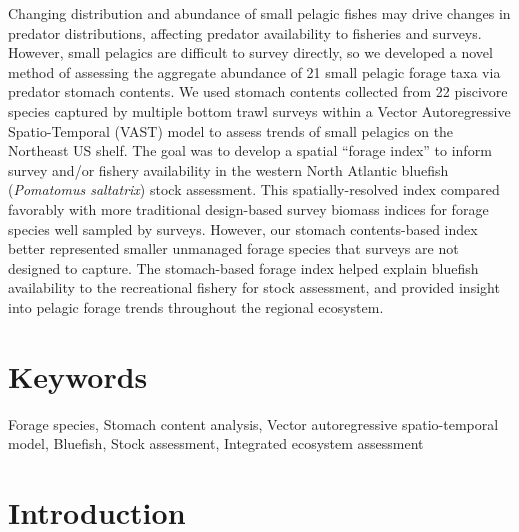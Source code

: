 \documentclass[
]{article}
\begin{document}
Changing distribution and abundance of small pelagic fishes may drive changes in predator distributions, affecting predator availability to fisheries and surveys. However, small pelagics are difficult to survey directly, so we developed a novel method of assessing the aggregate abundance of 21 small pelagic forage taxa via predator stomach contents. We used stomach contents collected from 22 piscivore species captured by multiple bottom trawl surveys within a Vector Autoregressive Spatio-Temporal (VAST) model to assess trends of small pelagics on the Northeast US shelf. The goal was to develop a spatial ``forage index'' to inform survey and/or fishery availability in the western North Atlantic bluefish (\emph{Pomatomus saltatrix}) stock assessment. This spatially-resolved index compared favorably with more traditional design-based survey biomass indices for forage species well sampled by surveys. However, our stomach contents-based index better represented smaller unmanaged forage species that surveys are not designed to capture. The stomach-based forage index helped explain bluefish availability to the recreational fishery for stock assessment, and provided insight into pelagic forage trends throughout the regional ecosystem.

\hypertarget{keywords}{%
\section{Keywords}\label{keywords}}

Forage species, Stomach content analysis, Vector autoregressive spatio-temporal model, Bluefish, Stock assessment, Integrated ecosystem assessment

\hypertarget{introduction}{%
\section{Introduction}\label{introduction}}
\end{document}
